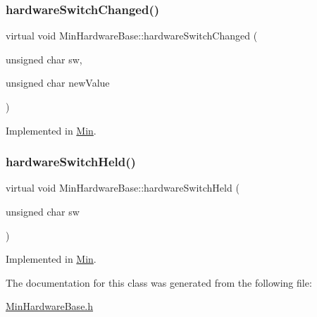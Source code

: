 \subsubsection{\texorpdfstring{hardware\+Switch\+Changed()}{hardwareSwitchChanged()}}
{\footnotesize\ttfamily virtual void Min\+Hardware\+Base\+::hardware\+Switch\+Changed (\begin{DoxyParamCaption}\item[{unsigned char}]{sw,  }\item[{unsigned char}]{new\+Value }\end{DoxyParamCaption})\hspace{0.3cm}{\ttfamily [pure virtual]}}



Implemented in \hyperlink{class_min_ae00f275ac6aeb73f932e62ae85abe5b1}{Min}.

\mbox{\label{class_min_hardware_base_a9e05f7b18377441b61457ded9a57f088}} 
\subsubsection{\texorpdfstring{hardware\+Switch\+Held()}{hardwareSwitchHeld()}}
{\footnotesize\ttfamily virtual void Min\+Hardware\+Base\+::hardware\+Switch\+Held (\begin{DoxyParamCaption}\item[{unsigned char}]{sw }\end{DoxyParamCaption})\hspace{0.3cm}{\ttfamily [pure virtual]}}



Implemented in \hyperlink{class_min_aa17c2510883d894f135d6a0582cc8bea}{Min}.



The documentation for this class was generated from the following file\+:\begin{DoxyCompactItemize}
\item 
\hyperlink{_min_hardware_base_8h}{Min\+Hardware\+Base.\+h}\end{DoxyCompactItemize}
